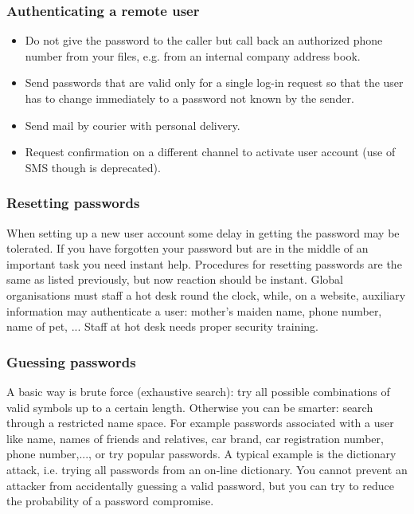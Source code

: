 \documentclass[a4paper, 10pt, titlepage]{article}
\begin{document}
\subsubsection*{Authenticating a remote user}
\begin{itemize}
\item Do not give the password to the caller but call back an authorized phone number from your files, e.g. from an internal company address book. 
\item Send passwords that are valid only for a single log-in request so that the user has to change immediately to a password not known by the sender.
\item Send mail by courier with personal delivery.
\item Request confirmation on a different channel to activate user account (use of SMS though is deprecated).
\end{itemize}

\subsubsection*{Resetting passwords}
When setting up a new user account some delay in getting the
password may be tolerated. If you have forgotten your password but are in the middle of an important task you need instant help. Procedures for resetting passwords are the same as listed previously,
but now reaction should be instant. Global organisations must staff a hot desk round the clock, while, on a website, auxiliary information may authenticate a user: mother’s maiden name, phone number, name of pet, ... Staff at hot desk needs proper security training.

\subsubsection*{Guessing passwords}
A basic way is brute force (exhaustive search): try all possible combinations of valid symbols up to a certain length. Otherwise you can be smarter: search through a restricted name space. For example passwords associated with a user like name, names of friends and relatives, car brand, car registration number, phone number,..., or try popular passwords. A typical example is the dictionary attack, i.e. trying all passwords from an on-line dictionary. You cannot prevent an attacker from accidentally guessing a valid password, but you can try to reduce the probability of a password compromise.
\end{document}

